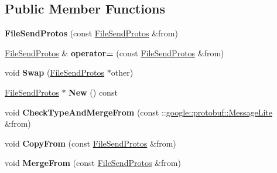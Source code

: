 \subsection*{Public Member Functions}
\begin{DoxyCompactItemize}
\item 
\mbox{\label{classruntime_1_1FileSendProtos_a56dd3149794c249c4d7afc2fced634a1}} 
{\bfseries File\+Send\+Protos} (const \hyperlink{classruntime_1_1FileSendProtos}{File\+Send\+Protos} \&from)
\item 
\mbox{\label{classruntime_1_1FileSendProtos_a52a1618f06df7e81c5f3c8b0332abeff}} 
\hyperlink{classruntime_1_1FileSendProtos}{File\+Send\+Protos} \& {\bfseries operator=} (const \hyperlink{classruntime_1_1FileSendProtos}{File\+Send\+Protos} \&from)
\item 
\mbox{\label{classruntime_1_1FileSendProtos_aed7ac6a12ec762db1a8363fc5b351bf4}} 
void {\bfseries Swap} (\hyperlink{classruntime_1_1FileSendProtos}{File\+Send\+Protos} $\ast$other)
\item 
\mbox{\label{classruntime_1_1FileSendProtos_abbbe448eff52c4b2211200e3d0b83c3c}} 
\hyperlink{classruntime_1_1FileSendProtos}{File\+Send\+Protos} $\ast$ {\bfseries New} () const
\item 
\mbox{\label{classruntime_1_1FileSendProtos_a6779b135aa023d907beeb7c0d761c892}} 
void {\bfseries Check\+Type\+And\+Merge\+From} (const \+::\hyperlink{classgoogle_1_1protobuf_1_1MessageLite}{google\+::protobuf\+::\+Message\+Lite} \&from)
\item 
\mbox{\label{classruntime_1_1FileSendProtos_a4684f10ce66fb855d89e494c0d1f0cde}} 
void {\bfseries Copy\+From} (const \hyperlink{classruntime_1_1FileSendProtos}{File\+Send\+Protos} \&from)
\item 
\mbox{\label{classruntime_1_1FileSendProtos_a656829a69edfda060e556a8c8ef8e50d}} 
void {\bfseries Merge\+From} (const \hyperlink{classruntime_1_1FileSendProtos}{File\+Send\+Protos} \&from)
\item 
\mbox{\label{classruntime_1_1FileSendProtos_a9c40bad1405c3b41433409ba4a7f302e}} 

\end{DoxyCompactItemize}
